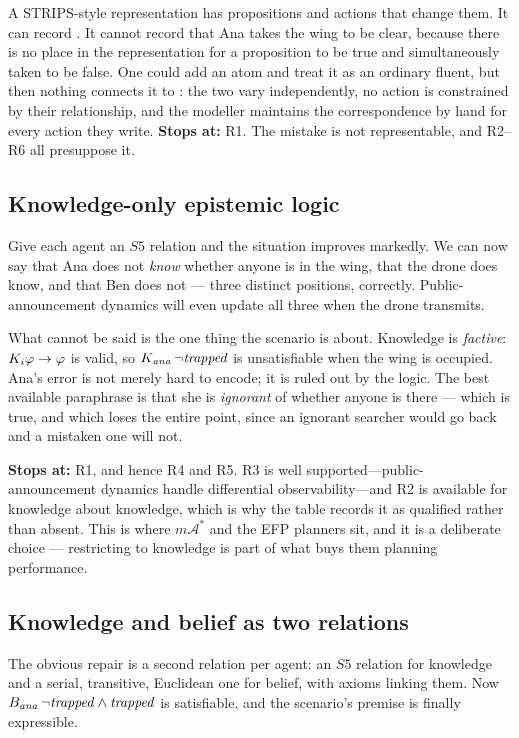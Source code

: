 \documentclass[11pt,a4paper]{article}
\begin{document}
A STRIPS-style representation has propositions and actions that change them. It can record
. It cannot record that Ana takes the wing to be clear, because there
is no place in the representation for a proposition to be true and simultaneously taken to be
false. One could add an atom  and treat it as an ordinary fluent,
but then nothing connects it to : the two vary independently, no action is
constrained by their relationship, and the modeller maintains the correspondence by hand for
every action they write. \textbf{Stops at:} R1. The mistake is not representable, and R2--R6 all presuppose it.

\subsection{Knowledge-only epistemic logic}

Give each agent an $S5$ relation and the situation improves markedly. We can now say that Ana
does not \emph{know} whether anyone is in the wing, that the drone does know, and that Ben does
not --- three distinct positions, correctly. Public-announcement dynamics will even update all
three when the drone transmits.

What cannot be said is the one thing the scenario is about. Knowledge is \emph{factive}:
$K_{i}\varphi \to \varphi$ is valid, so
$K_{\mathit{ana}}\,\neg\mathit{trapped}$ is unsatisfiable when the wing is occupied. Ana's
error is not merely hard to encode; it is ruled out by the logic. The best available paraphrase
is that she is \emph{ignorant} of whether anyone is there --- which is true, and which loses the
entire point, since an ignorant searcher would go back and a mistaken one will not.

\textbf{Stops at:} R1, and hence R4 and R5. R3 is well supported---public-announcement dynamics handle differential observability---and R2 is available for knowledge about knowledge, which is why the table records it as qualified rather than absent. This is where $m\mathcal{A}^*$ \citep{baral} and the EFP
planners \citep{le2018} sit, and it is a deliberate choice --- restricting to knowledge is
part of what buys them planning performance.

\subsection{Knowledge and belief as two relations}

The obvious repair is a second relation per agent: an $S5$ relation for knowledge and a
serial, transitive, Euclidean one for belief, with axioms linking them. Now
$B_{\mathit{ana}}\,\neg\mathit{trapped} \wedge \mathit{trapped}$ is satisfiable, and
the scenario's premise is finally expressible.
\end{document}
